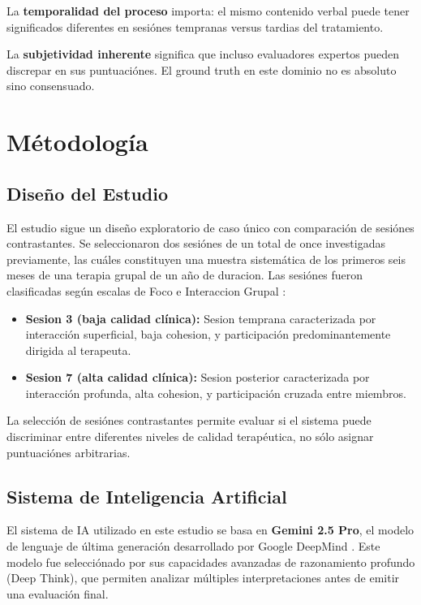 \documentclass[12pt,a4paper,twoside]{book}
\begin{document}
La \textbf{temporalidad del proceso} importa: el mismo contenido verbal puede tener significados diferentes en sesiónes tempranas versus tardias del tratamiento.

La \textbf{subjetividad inherente} significa que incluso evaluadores expertos pueden discrepar en sus puntuaciónes. El ground truth en este dominio no es absoluto sino consensuado.

\section{Métodología}

\subsection{Diseño del Estudio}

El estudio sigue un diseño exploratorio de caso único con comparación de sesiónes contrastantes. Se seleccionaron dos sesiónes de un total de once investigadas previamente, las cuáles constituyen una muestra sistemática de los primeros seis meses de una terapia grupal de un año de duracion. Las sesiónes fueron clasificadas según escalas de Foco e Interaccion Grupal \cite{toranzo2008}:

\begin{itemize}
    \item \textbf{Sesion 3 (baja calidad clínica):} Sesion temprana caracterizada por interacción superficial, baja cohesion, y participación predominantemente dirigida al terapeuta.
    \item \textbf{Sesion 7 (alta calidad clínica):} Sesion posterior caracterizada por interacción profunda, alta cohesion, y participación cruzada entre miembros.
\end{itemize}

La selección de sesiónes contrastantes permite evaluar si el sistema puede discriminar entre diferentes niveles de calidad terapéutica, no sólo asignar puntuaciónes arbitrarias.

\subsection{Sistema de Inteligencia Artificial}

El sistema de IA utilizado en este estudio se basa en \textbf{Gemini 2.5 Pro}, el modelo de lenguaje de última generación desarrollado por Google DeepMind \cite{gemini2025}. Este modelo fue selecciónado por sus capacidades avanzadas de razonamiento profundo (Deep Think), que permiten analizar múltiples interpretaciones antes de emitir una evaluación final.
\end{document}
